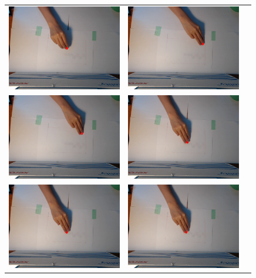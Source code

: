 \begin{tabular}{lll}
	\includegraphics[width=5cm]{fig2/im2_109.png} &
	\includegraphics[width=5cm]{fig2/im2_133.png} \\
  \includegraphics[width=5cm]{fig2/im2_138.png}&
	\includegraphics[width=5cm]{fig2/im2_4.png}  \\
	\includegraphics[width=5cm]{fig2/im2_5.png}  &
	\includegraphics[width=5cm]{fig2/im2_6.png}
\end{tabular}
